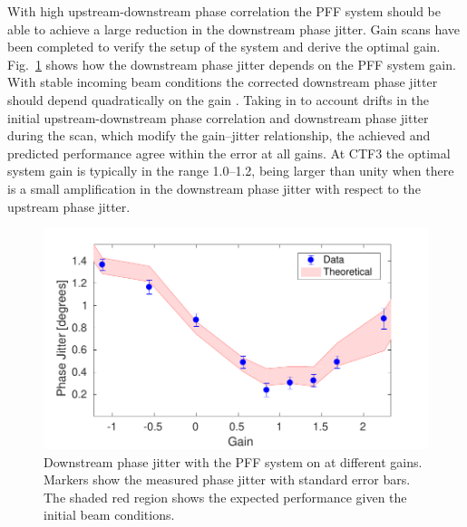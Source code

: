 \documentclass[%
 reprint,
superscriptaddress,
 amsmath,amssymb,
 prl,
]{revtex4-1}
\begin{document}


With high upstream-downstream phase correlation the PFF system should be able 
to achieve a large reduction in the downstream phase jitter. Gain scans have 
been completed to verify the setup of the system and derive the optimal gain.
Fig.~\ref{fig:gScan} shows how the downstream phase jitter depends on the PFF 
system gain. With stable incoming beam conditions the corrected downstream 
phase jitter 
should depend quadratically on the gain \cite{RobertsThesis}. Taking in to 
account drifts in the initial upstream-downstream phase correlation and 
downstream phase jitter during the scan, which modify the gain--jitter 
relationship, the achieved and predicted performance agree within the error at 
all gains. At CTF3 the optimal system gain is typically in the range 1.0--1.2, 
being larger than unity when there is a small amplification in the downstream 
phase jitter with respect to the upstream phase jitter.

\begin{figure}
\includegraphics[width=\columnwidth]{figs/gScan}%
\caption{\label{fig:gScan}Downstream phase jitter with the PFF system on at 
different gains. Markers show the measured phase jitter with standard error 
bars. The shaded red region shows the expected performance given the initial 
beam conditions.}
\end{figure}
\end{document}
